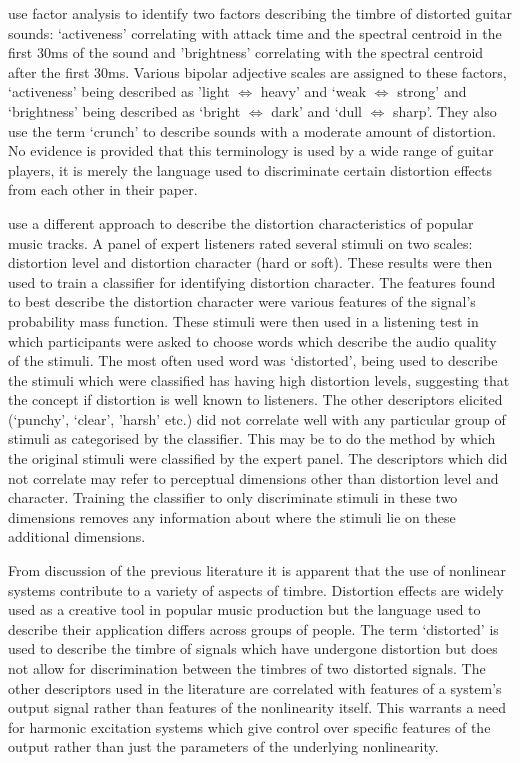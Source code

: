 	\citet{tsumoto2015investigating} use factor analysis to identify two factors describing the timbre of distorted
	guitar sounds: `activeness' correlating with attack time and the spectral centroid in the first 30ms of the sound
	and 'brightness' correlating with the spectral centroid after the first 30ms. Various bipolar adjective scales are
	assigned to these factors, `activeness' being described as 'light $\Leftrightarrow$ heavy' and `weak
	$\Leftrightarrow$ strong' and `brightness' being described as `bright $\Leftrightarrow$ dark' and `dull
	$\Leftrightarrow$ sharp'. They also use the term `crunch' to describe sounds with a moderate amount of distortion.
	No evidence is provided that this terminology is used by a wide range of guitar players, it is merely the language
	used to discriminate certain distortion effects from each other in their paper.

	\citet{wilson2014characterisation} use a different approach to describe the distortion characteristics of popular
	music tracks. A panel of expert listeners rated several stimuli on two scales: distortion level and distortion
	character (hard or soft). These results were then used to train a classifier for identifying distortion character.
	The features found to best describe the distortion character were various features of the signal's probability mass
	function. These stimuli were then used in a listening test in which participants were asked to choose words which
	describe the audio quality of the stimuli. The most often used word was `distorted', being used to describe the
	stimuli which were classified has having high distortion levels, suggesting that the concept if distortion is well
	known to listeners. The other descriptors elicited (`punchy', `clear', 'harsh' etc.) did not correlate well with any
	particular group of stimuli as categorised by the classifier. This may be to do the method by which the original
	stimuli were classified by the expert panel. The descriptors which did not correlate may refer to perceptual
	dimensions other than distortion level and character. Training the classifier to only discriminate stimuli in these
	two dimensions removes any information about where the stimuli lie on these additional dimensions.

	From discussion of the previous literature it is apparent that the use of nonlinear systems contribute to a variety
	of aspects of timbre. Distortion effects are widely used as a creative tool in popular music production but the
	language used to describe their application differs across groups of people. The term `distorted' is used to
	describe the timbre of signals which have undergone distortion but does not allow for discrimination between the
	timbres of two distorted signals. The other descriptors used in the literature are correlated with features of a
	system's output signal rather than features of the nonlinearity itself. This warrants a need for harmonic excitation
	systems which give control over specific features of the output rather than just the parameters of the underlying
	nonlinearity. 

